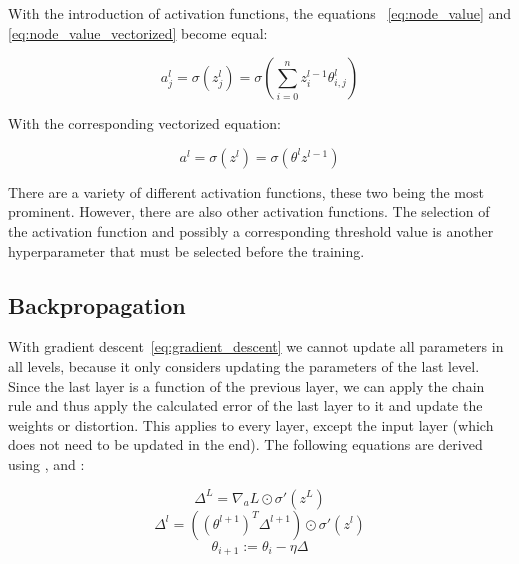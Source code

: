 With the introduction of activation functions, the equations ~\eqref{eq:node_value} and \eqref{eq:node_value_vectorized} become equal:

\begin{equation}
    a^l_j = \sigma(z^l_j) = \sigma(\sum^n_{i=0}z^{l-1}_i\theta^l_{i, j})
    \label{eq:activation}
\end{equation}

With the corresponding vectorized equation:

\begin{equation}
    a^l = \sigma(z^l) = \sigma(\theta^l z^{l-1})
    \label{eq:activation_vectorized}
\end{equation}

There are a variety of different activation functions, these two being the most prominent.
However, there are also other activation functions.
The selection of the activation function and possibly a corresponding threshold value is another hyperparameter that must be selected before the training.

\subsection{Backpropagation}

With gradient descent~\eqref{eq:gradient_descent} we cannot update all parameters in all levels, because it only considers updating the parameters of the last level.
Since the last layer is a function of the previous layer, we can apply the chain rule and thus apply the calculated error of the last layer to it and update the weights or distortion. This applies to every layer, except the input layer (which does not need to be updated in the end).
The following equations are derived using \cite[p.733]{StuartRussell2018}, \cite[p.197]{Goodfellow2017} and \cite[ch.2]{Nielsen2015}:

\begin{equation}
    \varDelta^L = \nabla_a L \odot \sigma'(z^L)
    \label{eq:output_error}
\end{equation}
\begin{equation}
    \varDelta^l = ((\theta^{l+1})^T \varDelta^{l+1}) \odot \sigma'(z^l)
    \label{eq:hidden_error}
\end{equation}
\begin{equation}
    \theta_{i+1} := \theta_i - \eta \varDelta
    \label{eq:backprop_update}
\end{equation}

